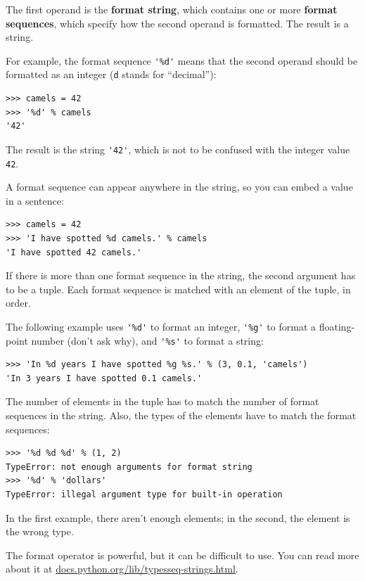 \documentclass[10pt]{book}
\begin{document}
\begin{CJK}{UTF8}{gbsn}
The first operand is the {\bf format string}, which contains
one or more {\bf format sequences}, which
specify how
the second operand is formatted.  The result is a string.

For example, the format sequence \verb"'%d'" means that
the second operand should be formatted as an
integer ({\tt d} stands for ``decimal''):

\begin{verbatim}
>>> camels = 42
>>> '%d' % camels
'42'
\end{verbatim}
%
The result is the string \verb"'42'", which is not to be confused
with the integer value {\tt 42}.

A format sequence can appear anywhere in the string,
so you can embed a value in a sentence:

\begin{verbatim}
>>> camels = 42
>>> 'I have spotted %d camels.' % camels
'I have spotted 42 camels.'
\end{verbatim}
%
If there is more than one format sequence in the string,
the second argument has to be a tuple.  Each format sequence is
matched with an element of the tuple, in order.

The following example uses \verb"'%d'" to format an integer,
\verb"'%g'" to format
a floating-point number (don't ask why), and \verb"'%s'" to format
a string:

\begin{verbatim}
>>> 'In %d years I have spotted %g %s.' % (3, 0.1, 'camels')
'In 3 years I have spotted 0.1 camels.'
\end{verbatim}
%
The number of elements in the tuple has to match the number
of format sequences in the string.  Also, the types of the
elements have to match the format sequences:

\begin{verbatim}
>>> '%d %d %d' % (1, 2)
TypeError: not enough arguments for format string
>>> '%d' % 'dollars'
TypeError: illegal argument type for built-in operation
\end{verbatim}
%
In the first example, there aren't enough elements; in the
second, the element is the wrong type.

The format operator is powerful, but it can be difficult to use.  You
can read more about it at
\url{docs.python.org/lib/typesseq-strings.html}.



\end{CJK}
\end{document}
